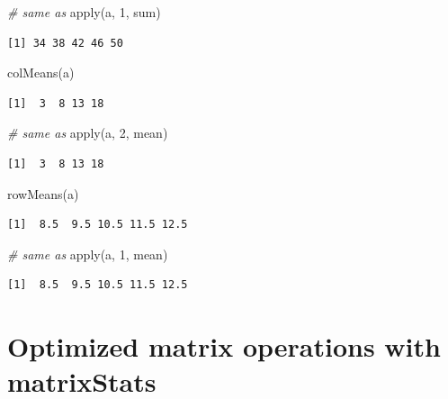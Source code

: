 \documentclass[
]{book}
\newenvironment{Shaded}{\begin{snugshade}}{\end{snugshade}}
\newcommand{\CommentTok}[1]{\textcolor[rgb]{0.56,0.35,0.01}{\textit{#1}}}
\newcommand{\DecValTok}[1]{\textcolor[rgb]{0.00,0.00,0.81}{#1}}
\newcommand{\FunctionTok}[1]{\textcolor[rgb]{0.00,0.00,0.00}{#1}}
\newcommand{\NormalTok}[1]{#1}
\begin{document}
\begin{Shaded}
\begin{Highlighting}[]
\CommentTok{\# same as}
\FunctionTok{apply}\NormalTok{(a, }\DecValTok{1}\NormalTok{, sum)}
\end{Highlighting}
\end{Shaded}

\begin{verbatim}
[1] 34 38 42 46 50
\end{verbatim}

\begin{Shaded}
\begin{Highlighting}[]
\FunctionTok{colMeans}\NormalTok{(a)}
\end{Highlighting}
\end{Shaded}

\begin{verbatim}
[1]  3  8 13 18
\end{verbatim}

\begin{Shaded}
\begin{Highlighting}[]
\CommentTok{\# same as}
\FunctionTok{apply}\NormalTok{(a, }\DecValTok{2}\NormalTok{, mean)}
\end{Highlighting}
\end{Shaded}

\begin{verbatim}
[1]  3  8 13 18
\end{verbatim}

\begin{Shaded}
\begin{Highlighting}[]
\FunctionTok{rowMeans}\NormalTok{(a)}
\end{Highlighting}
\end{Shaded}

\begin{verbatim}
[1]  8.5  9.5 10.5 11.5 12.5
\end{verbatim}

\begin{Shaded}
\begin{Highlighting}[]
\CommentTok{\# same as}
\FunctionTok{apply}\NormalTok{(a, }\DecValTok{1}\NormalTok{, mean)}
\end{Highlighting}
\end{Shaded}

\begin{verbatim}
[1]  8.5  9.5 10.5 11.5 12.5
\end{verbatim}

\hypertarget{optimized-matrix-operations-with-matrixstats}{%
\section{\texorpdfstring{Optimized matrix operations with \textbf{matrixStats}}{Optimized matrix operations with matrixStats}}\label{optimized-matrix-operations-with-matrixstats}}
\end{document}
